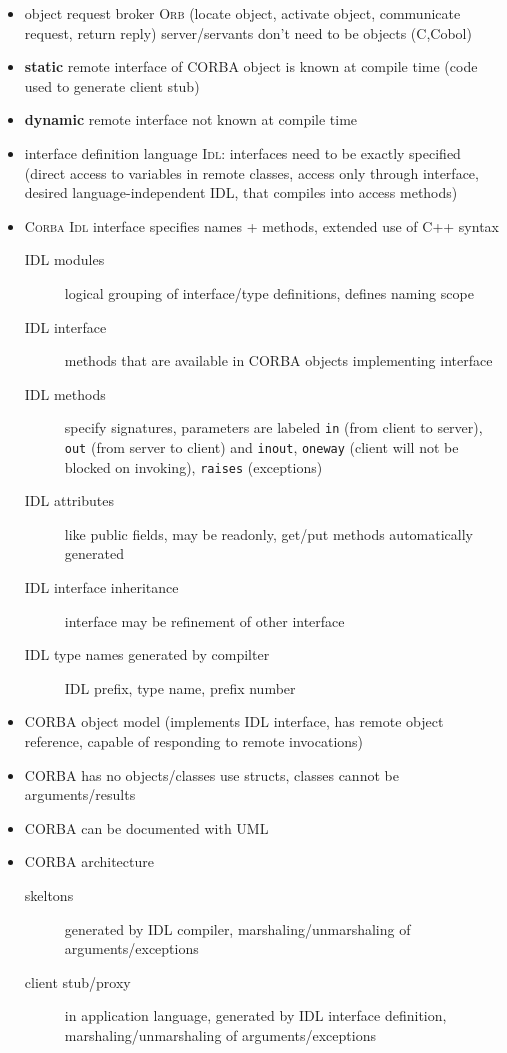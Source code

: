 \documentclass[a4paper, 10pt]{article}
\begin{document}
\begin{itemize}
\begin{itemize}
		\item object request broker \textsc{Orb} (locate object, activate object, communicate request, return reply) server/servants don't need to be objects (C,Cobol)
		\item \textbf{static} remote interface of CORBA object is known at compile time (code used to generate client stub)
		\item \textbf{dynamic} remote interface not known at compile time
		\item interface definition language \textsc{Idl}: interfaces need to be exactly specified (direct access to variables in remote classes, access only through interface, desired language-independent IDL, that compiles into access methods)
		\item \textsc{Corba Idl} interface specifies names + methods, extended use of C++ syntax
		\begin{description}
			\item[IDL modules] logical grouping of interface/type definitions, defines naming scope
			\item[IDL interface] methods that are available in CORBA objects implementing interface
			\item[IDL methods] specify signatures, parameters are labeled \texttt{in} (from client to server), \texttt{out} (from server to client) and \texttt{inout}, \texttt{oneway} (client will not be blocked on invoking), \texttt{raises} (exceptions)
			\item[IDL attributes] like public fields, may be readonly, get/put methods automatically generated
			\item[IDL interface inheritance] interface may be refinement of other interface
			\item[IDL type names generated by compilter] IDL prefix, type name, prefix number
		\end{description}
		\item CORBA object model (implements IDL interface, has remote object reference, capable of responding to remote invocations)
		\item CORBA has no objects/classes \follows use structs, classes cannot be arguments/results
		\item CORBA can be documented with UML
		\item CORBA architecture
		\begin{description}
			\item[skeltons] generated by IDL compiler, marshaling/unmarshaling of arguments/exceptions
			\item[client stub/proxy] in application language, generated by IDL interface definition, marshaling/unmarshaling of arguments/exceptions

\end{description}
\end{itemize}
\end{itemize}
\end{document}
